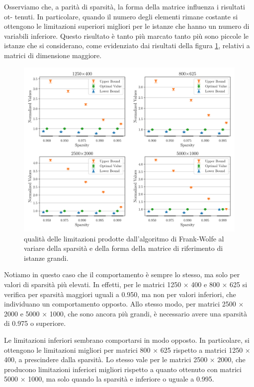 Osserviamo che, a parità di sparsità, la forma della matrice influenza i risultati ot- tenuti. In particolare, quando il
numero degli elementi rimane costante si ottengono le limitazioni superiori migliori per le istanze che hanno un numero
di variabili inferiore. Questo risultato è tanto più marcato tanto più sono piccole le istanze che si considerano, come
evidenziato dai risultati della figura \ref{fig:shape2}, relativi a matrici di dimensione maggiore.

\begin{figure}[ht]
    \centering
    \includegraphics[width=\textwidth]{assets/figures/shape2.pdf}
    \caption{qualità delle limitazioni prodotte dall’algoritmo di Frank-Wolfe al variare della sparsità e della forma
    della matrice di riferimento di istanze grandi.}
    \label{fig:shape2}
\end{figure}

\noindent
Notiamo in questo caso che il comportamento è sempre lo stesso, ma solo per valori di sparsità più elevati. In effetti,
per le matrici 1250 × 400 e 800 × 625 si verifica per sparsità maggiori uguali a 0.950, ma non per valori inferiori, che
individuano un comportamento opposto. Allo stesso modo, per matrici 2500 × 2000 e 5000 × 1000, che sono ancora più
grandi, è necessario avere una sparsità di 0.975 o superiore.

Le limitazioni inferiori sembrano comportarsi in modo opposto. In particolare, si ottengono le limitazioni migliori per
matrici 800 × 625 rispetto a matrici 1250 × 400, a prescindere dalla sparsità. Lo stesso vale per le matrici 2500 ×
2000, che producono limitazioni inferiori migliori rispetto a quanto ottenuto con matrici 5000 × 1000, ma solo quando la
sparsità e inferiore o uguale a 0.995.

